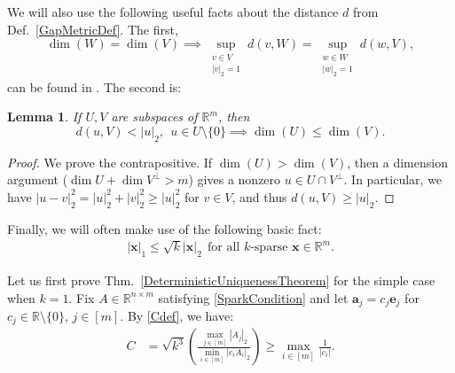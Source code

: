 \documentclass[journal, twocolumn]{IEEEtran}
\newtheorem{lemma}{Lemma}
\begin{document}
We will also use the following useful facts about the distance $d$ from Def.~\ref{GapMetricDef}. The first, 
\begin{equation}\label{SubspaceMetricSameDim}
\dim(W) = \dim(V) \implies \sup_{\substack{v \in V \\ |v|_2 = 1}}  d(v,W)  = \sup_{\substack{w \in W \\ |w|_2 = 1}} d(w,V),
\end{equation}
can be found in \cite[Lem.~3.3]{Morris10}. The second is:
\begin{lemma}\label{MinDimLemma}
If $U, V$ are subspaces of $\mathbb{R}^{m}$, then
\begin{equation*}
d(u,V) < |u|_2, \ \ u \in U \setminus{\{0\}} \implies \dim(U) \leq \dim(V).
\end{equation*}
\end{lemma}

\begin{proof}%
We prove the contrapositive.  If $\dim(U) > \dim(V)$, then a dimension argument ($\dim U + \dim V^\perp > m$) gives a nonzero $u \in U \cap V^\perp$.  In particular, we have $|u - v|_2^2 = |u|_2^2 + |v|_2^2 \geq |u|_2^2$ for $v \in V$, and thus $d(u,V) \geq |u|_2$.
\end{proof}

Finally, we will often make use of the following basic fact:
\begin{align}\label{sqrtk}
|\mathbf{x}|_1 \leq \sqrt{k} |\mathbf{x}|_2 \ \ \text{for all $k$-sparse $\mathbf{x} \in \mathbb{R}^m$}.
\end{align}

Let us first prove Thm.~\ref{DeterministicUniquenessTheorem} for the simple case when $k=1$. Fix $A \in \mathbb{R}^{n \times m}$ satisfying \eqref{SparkCondition} and let $\mathbf{a}_j = c_j \mathbf{e}_j$ for $c_j \in \mathbb{R} \setminus \{0\}$, $j \in [m]$. By \eqref{Cdef}, we have:
\begin{align}\label{C1}
C 
&= \sqrt{k^3} \left( \frac{\max_{j \in [m]} |A_j|_2}{\min_{i \in [m]}|c_iA_i|_2} \right)
\geq \max_{i \in [m]} \frac{1}{|c_i|}.
\end{align}
\end{document}
